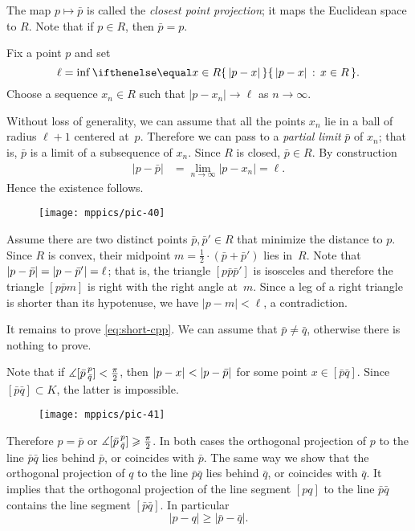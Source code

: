 The map $p\mapsto \bar p$ is called the \label{closest point projection}\emph{closest point projection};
it maps the Euclidean space to $R$.
Note that if $p\in R$, then $\bar p=p$.

Fix a point $p$ and set 
\[\ell=\inf\set{|p-x|}{x\in R}.\]
Choose a sequence $x_n\in R$ such that $|p-x_n|\to \ell$ as $n\to\infty$.

Without loss of generality, we can assume that all the points $x_n$ lie in a ball of radius $\ell+1$ centered at~$p$.
Therefore we can pass to a \emph{partial limit} $\bar p$ of $x_n$; that is, $\bar p$ is a limit of a subsequence of $x_n$.
Since $R$ is closed, $\bar p\in R$.
By construction 
\begin{align*}
|p-\bar p|&=\lim_{n\to\infty}|p-x_n|=\ell.
\end{align*}
Hence the existence follows.

{

\begin{wrapfigure}{r}{22 mm}
\vskip-0mm
\centering
\texttt{[image: mppics/pic-40]}
\vskip-0mm
\end{wrapfigure}

Assume there are two distinct points $\bar p, \bar p'\in R$ that minimize the distance to $p$.
Since $R$ is convex, their midpoint $m=\tfrac12\cdot (\bar p+\bar p')$ lies in~$R$.
Note that $|p-\bar p|\z=|p-\bar p'|=\ell$; that is, the triangle $[p\bar p\bar p']$ is isosceles and therefore the triangle $[p\bar p m]$ is right with the right angle at~$m$.
Since a leg of a right triangle is shorter than its hypotenuse, we have $|p-m|<\ell$, a contradiction. 

It remains to prove \ref{eq:short-cpp}.
We can assume that $\bar p\ne\bar q$, otherwise there is nothing to prove.

}

Note that if $\measuredangle [\bar p\,{}^{p}_{\bar q}]< \tfrac\pi2$, then $\dist{p}{x}{}\z<\dist{p}{\bar p}{}$ for some point $x\in [\bar p\bar q]$.
Since $[\bar p\bar q]\subset K$,
the latter is impossible.

\begin{wrapfigure}{l}{37 mm}
\vskip-0mm
\centering
\texttt{[image: mppics/pic-41]}
\vskip-0mm
\end{wrapfigure}

Therefore $p=\bar p$ or $\measuredangle [\bar p\,{}^{p}_{\bar q}]\geqslant \tfrac\pi2$.
In both cases the orthogonal projection of $p$ to the line $\bar p\bar q$ lies behind $\bar p$, or coincides with $\bar p$.
The same way we show that the orthogonal projection of $q$ to the line $\bar p\bar q$ lies behind $\bar q$, or coincides with $\bar q$.
It implies that the orthogonal projection of the line segment $[pq]$ to the line $\bar p\bar q$ contains the line segment $[\bar p\bar q]$.
In particular 
\[|p-q|\ge |\bar p-\bar q|.\]
\qedsf

